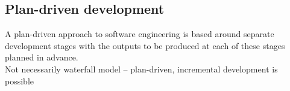 \documentclass[12pt]{article}
\begin{document}
\subsection{Plan-driven development}
A plan-driven approach to software engineering is based around separate development stages with the outputs to be produced at each of these stages planned in advance.
\\
Not necessarily waterfall model – plan-driven, incremental development is possible
\end{document}

